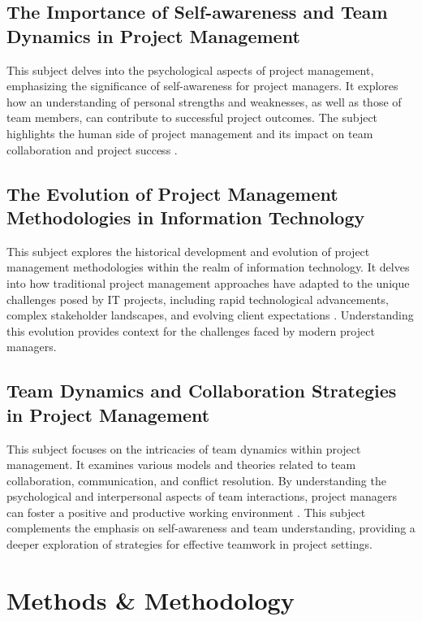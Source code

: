 \documentclass[11pt]{article}
\begin{document}
\subsection{The Importance of Self-awareness and Team Dynamics in Project Management}
This subject delves into the psychological aspects of project management, emphasizing the significance of self-awareness for project managers. It explores how an understanding of personal strengths and weaknesses, as well as those of team members, can contribute to successful project outcomes. The subject highlights the human side of project management and its impact on team collaboration and project success \cite{SchockSmith2017}.

\subsection{The Evolution of Project Management Methodologies in Information Technology}
This subject explores the historical development and evolution of project management methodologies within the realm of information technology. It delves into how traditional project management approaches have adapted to the unique challenges posed by IT projects, including rapid technological advancements, complex stakeholder landscapes, and evolving client expectations \cite{Pollack2007}. Understanding this evolution provides context for the challenges faced by modern project managers.

\subsection{Team Dynamics and Collaboration Strategies in Project Management}
This subject focuses on the intricacies of team dynamics within project management. It examines various models and theories related to team collaboration, communication, and conflict resolution. By understanding the psychological and interpersonal aspects of team interactions, project managers can foster a positive and productive working environment \cite{Zulch2014}. This subject complements the emphasis on self-awareness and team understanding, providing a deeper exploration of strategies for effective teamwork in project settings.

\section{Methods \& Methodology}
\end{document}
